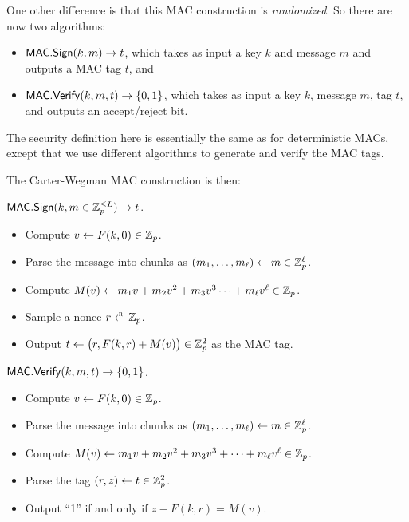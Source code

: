 One other difference is that this MAC construction is 
\emph{randomized}. So there are now two algorithms:
\begin{itemize}
  \item $\mathsf{MAC.Sign}(k, m) \to t$, which takes as input a key $k$ and message $m$
        and outputs a MAC tag $t$, and 
  \item $\mathsf{MAC.Verify}(k, m, t) \to \{0,1\}$, which takes as input a key $k$,
    message $m$, tag $t$, and outputs an accept/reject bit.
\end{itemize}
The security definition here is essentially the same as for deterministic MACs,
except that we use different algorithms to generate and verify the MAC tags.

The Carter-Wegman MAC construction is then:

\medskip
\noindent
$\mathsf{MAC.Sign}(k, m \in \mathbb{Z}^{\leq L}_p) \to t$.
\begin{itemize}[noitemsep]
  \item Compute $v \gets F(k, 0) \in \mathbb{Z}_p$.
  \item Parse the message into chunks as $(m_1, \dots, m_{\ell}) \gets m \in \mathbb{Z}_p^\ell$.
  \item Compute $M(v) \gets m_1 v + m_2 v^2 + m_3 v^3 \cdots + m_{\ell} v^{\ell} \in \mathbb{Z}_p$. \\
  \item Sample a nonce $r \getsr \Z_p$.
  \item Output $t \gets \big(r, F(k, r) + M(v)\big) \in \mathbb{Z}^2_p$ as the MAC tag.
\end{itemize}

\medskip
\noindent
$\mathsf{MAC.Verify}(k, m, t) \to \{0,1\}$.
\begin{itemize}[noitemsep]
  \item Compute $v \gets F(k, 0) \in \mathbb{Z}_p$.
  \item Parse the message into chunks as $(m_1, \dots, m_{\ell}) \gets m \in \mathbb{Z}_p^\ell$.
  \item Compute $M(v) \gets m_1 v + m_2 v^2 + m_3 v^3 + \cdots + m_{\ell} v^{\ell}\in \mathbb{Z}_p$. \\
  \item Parse the tag $(r, z) \gets t \in \mathbb{Z}^2_p$.
  \item Output ``1'' if and only if $z - F(k, r) = M(v)$. 
\end{itemize}


